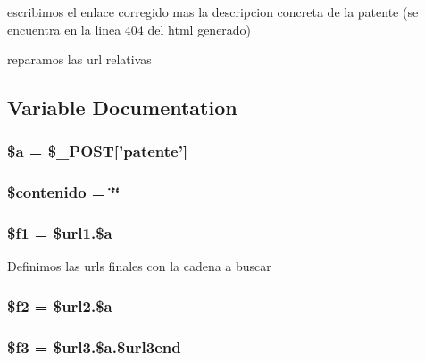 escribimos el enlace corregido mas la descripcion concreta de la patente (se encuentra en la linea 404 del html generado)

reparamos las url relativas

\subsection{Variable Documentation}
\hypertarget{accion_8php_acebf83966ef6d7e5645a6b62ba368f9f}{
\subsubsection[{\$a}]{\setlength{\rightskip}{0pt plus 5cm}\$a = \$\-\_\-\-P\-O\-S\-T\mbox{[}'patente'\mbox{]}}}\label{accion_8php_acebf83966ef6d7e5645a6b62ba368f9f}
\hypertarget{accion_8php_acc746630ee64ff7254fea9f0473dc1c6}{
\subsubsection[{\$contenido}]{\setlength{\rightskip}{0pt plus 5cm}\$contenido = \char`\"{}\char`\"{}}}\label{accion_8php_acc746630ee64ff7254fea9f0473dc1c6}
\hypertarget{accion_8php_a8f4c2e985a8fcfe3137f3758fd0bddeb}{
\subsubsection[{\$f1}]{\setlength{\rightskip}{0pt plus 5cm}\$f1 = \${\bf url1.\$a}}}\label{accion_8php_a8f4c2e985a8fcfe3137f3758fd0bddeb}
Definimos las urls finales con la cadena a buscar \hypertarget{accion_8php_a700a13b72fad231fc3fa2c45597a5615}{
\subsubsection[{\$f2}]{\setlength{\rightskip}{0pt plus 5cm}\$f2 = \${\bf url2.\$a}}}\label{accion_8php_a700a13b72fad231fc3fa2c45597a5615}
\hypertarget{accion_8php_acbfa0f89ab3a6c40073dcc48aff0e97d}{
\subsubsection[{\$f3}]{\setlength{\rightskip}{0pt plus 5cm}\$f3 = \${\bf url3.\$a.\$url3end}}}\label{accion_8php_acbfa0f89ab3a6c40073dcc48aff0e97d}

